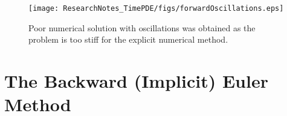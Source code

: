 \begin{figure}[H]
\centering
\texttt{[image: ResearchNotes\_TimePDE/figs/forwardOscillations.eps]}
\caption{Poor numerical solution with oscillations was obtained as the problem is too stiff for the explicit numerical method.}
\label{fig:falseOscillation}
\end{figure}

\section{The Backward (Implicit) Euler Method}

